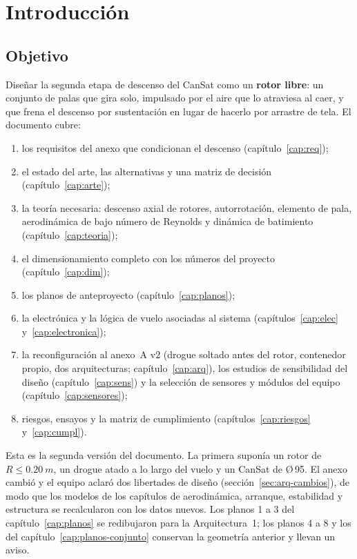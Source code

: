 \chapter{Introducción}\label{cap:intro}

\section{Objetivo}
Diseñar la segunda etapa de descenso del CanSat como un \textbf{rotor libre}: un conjunto
de palas que gira solo, impulsado por el aire que lo atraviesa al caer, y que frena el
descenso por sustentación en lugar de hacerlo por arrastre de tela. El documento cubre:
\begin{enumerate}
  \item los requisitos del anexo que condicionan el descenso (capítulo~\ref{cap:req});
  \item el estado del arte, las alternativas y una matriz de decisión (capítulo~\ref{cap:arte});
  \item la teoría necesaria: descenso axial de rotores, autorrotación, elemento de pala,
        aerodinámica de bajo número de Reynolds y dinámica de batimiento
        (capítulo~\ref{cap:teoria});
  \item el dimensionamiento completo con los números del proyecto
        (capítulo~\ref{cap:dim});
  \item los planos de anteproyecto (capítulo~\ref{cap:planos});
  \item la electrónica y la lógica de vuelo asociadas al sistema (capítulos~\ref{cap:elec}
        y~\ref{cap:electronica});
  \item la reconfiguración al anexo~A v2 (drogue soltado antes del rotor, contenedor propio,
        dos arquitecturas; capítulo~\ref{cap:arq}), los estudios de sensibilidad del diseño
        (capítulo~\ref{cap:sens}) y la selección de sensores y módulos del equipo
        (capítulo~\ref{cap:sensores});
  \item riesgos, ensayos y la matriz de cumplimiento (capítulos~\ref{cap:riesgos}
        y~\ref{cap:cumpl}).
\end{enumerate}

Esta es la segunda versión del documento. La primera suponía un rotor de $R\le\SI{0.20}{m}$,
un drogue atado a lo largo del vuelo y un CanSat de Ø\,95. El anexo cambió y el equipo aclaró
dos libertades de diseño (sección~\ref{sec:arq-cambios}), de modo que los modelos de los
capítulos de aerodinámica, arranque, estabilidad y estructura se recalcularon con los datos
nuevos. Los planos 1 a 3 del capítulo~\ref{cap:planos} se redibujaron para la Arquitectura~1; los
planos 4 a 8 y los del capítulo~\ref{cap:planos-conjunto} conservan la geometría anterior y llevan un aviso.

